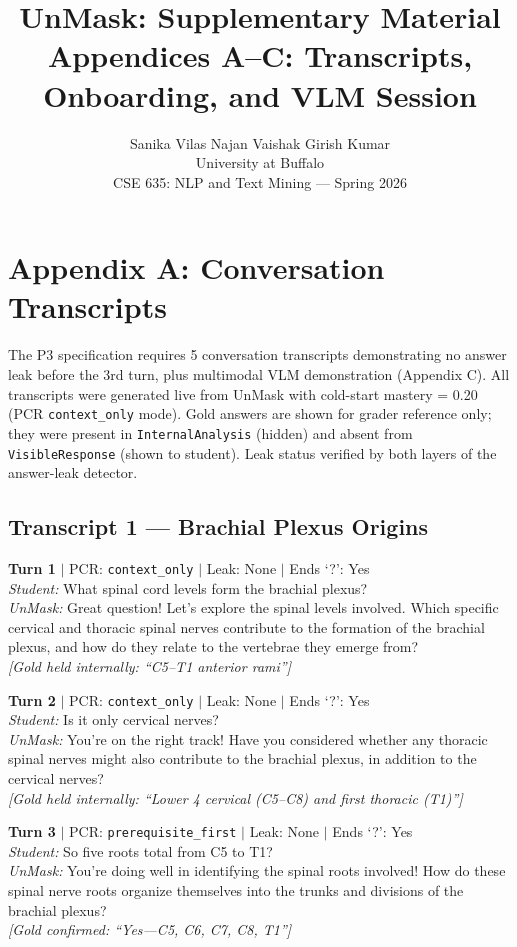 \documentclass[11pt]{article}
\title{UnMask: Supplementary Material\\
\large Appendices A--C: Transcripts, Onboarding, and VLM Session}
\author{Sanika Vilas Najan \quad Vaishak Girish Kumar \\
  University at Buffalo \\
  CSE 635: NLP and Text Mining --- Spring 2026}
\begin{document}
\maketitle

\section*{Appendix A: Conversation Transcripts}
\label{app:transcripts}

The P3 specification requires 5 conversation transcripts demonstrating no
answer leak before the 3rd turn, plus multimodal VLM demonstration (Appendix C).
All transcripts were generated live from UnMask with cold-start mastery = 0.20
(PCR \texttt{context\_only} mode).
Gold answers are shown for grader reference only; they were present in
\texttt{InternalAnalysis} (hidden) and absent from \texttt{VisibleResponse}
(shown to student).
Leak status verified by both layers of the answer-leak detector.

\subsection*{Transcript 1 --- Brachial Plexus Origins}

\noindent\textbf{Turn 1} $|$ PCR: \texttt{context\_only} $|$ Leak: None $|$ Ends `?': Yes\\
\textit{Student:} What spinal cord levels form the brachial plexus?\\
\textit{UnMask:} Great question! Let's explore the spinal levels involved.
Which specific cervical and thoracic spinal nerves contribute to the formation
of the brachial plexus, and how do they relate to the vertebrae they emerge
from?\\
{\small\textit{[Gold held internally: ``C5--T1 anterior rami'']}}

\noindent\textbf{Turn 2} $|$ PCR: \texttt{context\_only} $|$ Leak: None $|$ Ends `?': Yes\\
\textit{Student:} Is it only cervical nerves?\\
\textit{UnMask:} You're on the right track! Have you considered whether any
thoracic spinal nerves might also contribute to the brachial plexus, in
addition to the cervical nerves?\\
{\small\textit{[Gold held internally: ``Lower 4 cervical (C5--C8) and first thoracic (T1)'']}}

\noindent\textbf{Turn 3} $|$ PCR: \texttt{prerequisite\_first} $|$ Leak: None $|$ Ends `?': Yes\\
\textit{Student:} So five roots total from C5 to T1?\\
\textit{UnMask:} You're doing well in identifying the spinal roots involved!
How do these spinal nerve roots organize themselves into the trunks and
divisions of the brachial plexus?\\
{\small\textit{[Gold confirmed: ``Yes---C5, C6, C7, C8, T1'']}}
\end{document}
